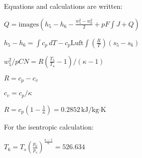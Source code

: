 Equations and calculations are written:  

\( Q = \text{images} \left( h_5 - h_6 - \frac{w_5^2 - w_6^2}{2} + pF \int J + Q \right) \)  

\( h_5 - h_6 = \int c_p \, dT - c_p \text{Luft} \int \left( \frac{R}{T} \right) (s_5 - s_6) \)  

\( w_5^2 / pCN = R \left( \frac{T_5}{T_4} - 1 \right) / (\kappa - 1) \)  

\( R = c_p - c_v \)  

\( c_v = c_p / \kappa \)  

\( R = c_p \left( 1 - \frac{1}{\kappa} \right) = 0.2852 \, \text{kJ/kg·K} \)  

For the isentropic calculation:  

\( T_6 = T_s \left( \frac{p_6}{p_s} \right)^{\frac{\kappa - 1}{\kappa}} = 526.634 \)